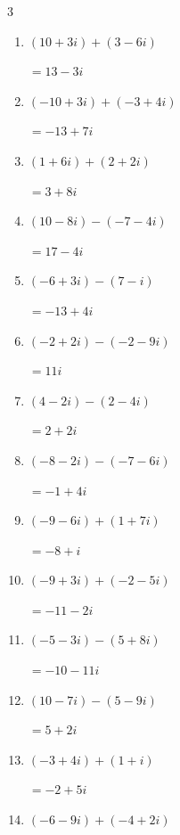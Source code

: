 \begin{multicols}{3}
\begin{enumerate}
  \item $\displaystyle (10+3i) + (3-6i)$

        $\displaystyle =13-3i$

  \item $\displaystyle (-10+3i) + (-3+4i)$

        $\displaystyle =-13+7i$

  \item $\displaystyle (1+6i) + (2+2i)$

        $\displaystyle =3+8i$

  \item $\displaystyle (10-8i) - (-7-4i)$

        $\displaystyle =17-4i$

  \item $\displaystyle (-6+3i) - (7-i)$

        $\displaystyle =-13+4i$

  \item $\displaystyle (-2+2i) - (-2-9i)$

        $\displaystyle =11i$

  \item $\displaystyle (4-2i) - (2-4i)$

        $\displaystyle =2+2i$

  \item $\displaystyle (-8-2i) - (-7-6i)$

        $\displaystyle =-1+4i$

  \item $\displaystyle (-9-6i) + (1+7i)$

        $\displaystyle =-8+i$

  \item $\displaystyle (-9+3i) + (-2-5i)$

        $\displaystyle =-11-2i$

\columnbreak %

  \item $\displaystyle (-5-3i) - (5+8i)$

        $\displaystyle =-10-11i$

  \item $\displaystyle (10-7i) - (5-9i)$

        $\displaystyle =5+2i$

  \item $\displaystyle (-3+4i) + (1+i)$

        $\displaystyle =-2+5i$

  \item $\displaystyle (-6-9i) + (-4+2i)$


\end{enumerate}
\end{multicols}
